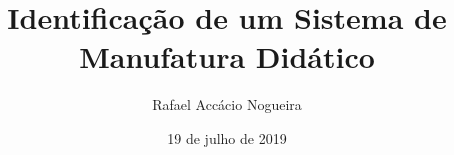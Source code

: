 {

\begin{frame}[plain]
\vspace*{8mm}
\title{Identificação de um Sistema de Manufatura Didático}
\author{\vspace{-.3cm} Rafael Accácio Nogueira}
\date{\vspace{1cm} 19 de julho de 2019}
\titlepage
\end{frame}
}

